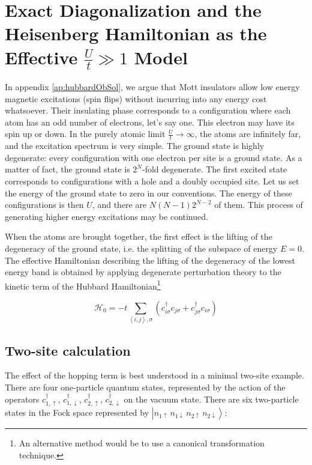 \section{Exact Diagonalization and the Heisenberg Hamiltonian as the Effective $\frac{U}{t} \gg 1$ Model }\label{sec:effectiveHeisenberg}

In appendix \ref{ap:hubbardObSol}, we argue that Mott insulators allow low energy magnetic excitations (spin flips) without incurring into any energy cost whatsoever.
Their insulating phase corresponds to a configuration where each atom has an odd number of electrons, let's say one.
This electron may have its spin up or down.
In the purely atomic limit $\frac{U}{t} \rightarrow \infty$, the atoms are infinitely far, and the excitation spectrum is very simple.
The ground state is highly degenerate: every configuration with one electron per site is a ground state.
As a matter of fact, the ground state is $2^N$-fold degenerate.
The first excited state corresponds to configurations with a hole and a doubly occupied site.
Let us set the energy of the ground state to zero in our conventions.
The energy of these configurations is then $U$, and there are $N(N-1)2^{N-2}$ of them.
This process of generating higher energy excitations may be continued.

When the atoms are brought together, the first effect is the lifting of the degeneracy of the ground state, i.e. the splitting of the subspace of energy $E = 0$.
The effective Hamiltonian describing the lifting of the degeneracy of the lowest energy band is obtained by applying degenerate perturbation theory \cite{mila_physique_2007} to the kinetic term of the Hubbard Hamiltonian\footnote{An alternative method would be to use a canonical transformation technique.}

\begin{equation}
\mathcal{H}_0 = - t \sum_{\left\langle i, j \right\rangle, \sigma} ( c_{i\sigma}^\dagger c_{j\sigma} + c_{j\sigma}^\dagger c_{i\sigma} ) 
\end{equation}

\subsection{Two-site calculation}

The effect of the hopping term is best understood in a minimal two-site example.
There are four one-particle quantum states, represented by the action of the operators $c_{1,\uparrow}^\dagger$, $c_{1,\downarrow}^\dagger$, $c_{2,\uparrow}^\dagger$, $c_{2,\downarrow}^\dagger$ on the vacuum state.
There are six two-particle states in the Fock space represented by $\left| n_{1\uparrow} \,  n_{1\downarrow} \,  n_{2\uparrow} \, n_{2\downarrow} \right\rangle$:

